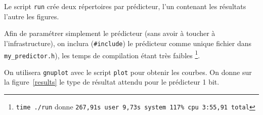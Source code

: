 \documentclass[a4paper]{article}
\begin{document}
Le script \verb+run+ crée deux répertoires par prédicteur, l'un contenant les résultats l'autre les figures.

Afin de paramétrer simplement le prédicteur (sans avoir à toucher à l'infrastructure), on inclura (\verb+#include+) le prédicteur  comme unique fichier dans \verb+my_predictor.h+), les temps de compilation étant très faibles%
\footnote{\texttt{time ./run} donne \texttt{267,91s user 9,73s system 117\% cpu 3:55,91 total}}.

On utilisera \verb+gnuplot+ avec le script \verb+plot+ pour obtenir les courbes. 
On donne sur la figure~\ref{results} le type de résultat attendu pour le prédicteur 1 bit.

      \begin{figure}[htb]
      \centering
\end{figure}
\end{document}
